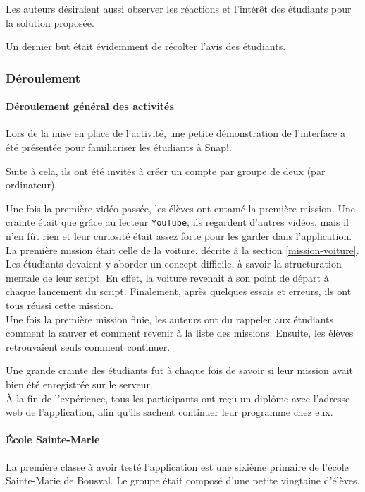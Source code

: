 Les auteurs désiraient aussi observer les réactions et l'intérêt des étudiants pour la solution proposée.

Un dernier but était évidemment de récolter l'avis des étudiants. 

\subsubsection{Déroulement}
\paragraph{Déroulement général des activités}
Lors de la mise en place de l'activité, une petite démonstration de l'interface a été présentée pour familiariser les étudiants à Snap!. 

Suite à cela, ils ont été invités à créer un compte par groupe de deux (par ordinateur).

Une fois la première vidéo passée, les élèves ont entamé la première mission. Une crainte était que grâce au lecteur \texttt{YouTube}, ils regardent d'autres vidéos, mais il n'en fût rien et leur curiosité était assez forte pour les garder dans l'application.\\%

La première mission était celle de la voiture, décrite à la section \ref{mission-voiture}. Les étudiants devaient y aborder un concept difficile, à savoir la structuration mentale de leur script. En effet, la voiture revenait à son point de départ à chaque lancement du script. Finalement, après quelques essais et erreurs, ils ont tous réussi cette mission.\\

Une fois la première mission finie, les auteurs ont du rappeler aux étudiants comment la sauver et comment revenir à la liste des missions. Ensuite, les élèves retrouvaient seuls comment continuer. 

Une grande crainte des étudiants fut à chaque fois de savoir si leur mission avait bien été enregistrée sur le serveur.\\%

À la fin de l'expérience, tous les participants ont reçu un diplôme avec l'adresse web de l'application, afin qu'ils sachent continuer leur programme chez eux.

\paragraph{École Sainte-Marie} 
La première classe à avoir testé l'application est une sixième primaire de l'école Sainte-Marie de Bousval. Le groupe était composé d'une petite vingtaine d'élèves.

